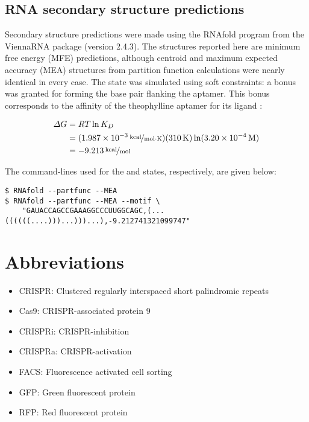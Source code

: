 \documentclass[10pt,oneside]{article}
\begin{document}
\subsection{RNA secondary structure predictions}

Secondary structure predictions were made using the RNAfold program from the ViennaRNA package (version 2.4.3).  The structures reported here are minimum free energy (MFE) predictions, although centroid and maximum expected accuracy (MEA) structures from partition function calculations were nearly identical in every case.  The \holo{} state was simulated using soft constraints: a  bonus was granted for forming the base pair flanking the aptamer.  This bonus corresponds to the  affinity of the theophylline aptamer for its ligand \autocite{jenison1994}:

\begin{align*}
\Delta G
    &= RT \ln K_D \\
    &= (\unitfrac[\mathrm{1.987 \times 10^{-3}}]{kcal}{mol \cdot K}) 
       (\unit[\mathrm{310}]{K}) 
       \ln (\unit[\mathrm{3.20 \times 10^{-4}}]{M}) \\
    &= \unitfrac[\mathrm{-9.213}]{kcal}{mol} \\
\end{align*}

The command-lines used for the \apo{} and \holo{} states, respectively, are given below:

\begin{verbatim}
$ RNAfold --partfunc --MEA
$ RNAfold --partfunc --MEA --motif \
    "GAUACCAGCCGAAAGGCCCUUGGCAGC,(...((((((....)))...)))...),-9.212741321099747"
\end{verbatim}


\section{Abbreviations}

\begin{itemize}
    \item CRISPR: Clustered regularly interspaced short palindromic repeats
    \item Cas9: CRISPR-associated protein 9
    \item CRISPRi: CRISPR-inhibition
    \item CRISPRa: CRISPR-activation
    \item FACS: Fluorescence activated cell sorting
    \item GFP: Green fluorescent protein
    \item RFP: Red fluorescent protein
\end{itemize}
\end{document}
